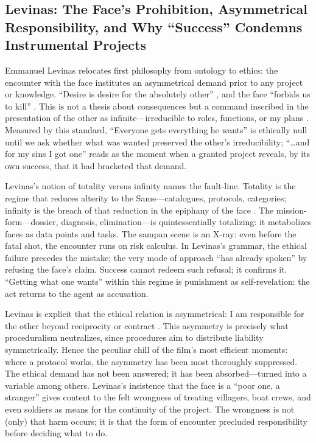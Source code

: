 \subsection*{Levinas: The Face's Prohibition, Asymmetrical Responsibility, and Why
	``Success'' Condemns Instrumental Projects}
\label{ssec:iii-levinas}
Emmanuel Levinas relocates first philosophy from ontology to ethics: the encounter with the face
institutes an asymmetrical demand prior to any project or knowledge. ``Desire is desire for the
absolutely other'' \parencite[p.~33]{LevinasTI1969}, and the face ``forbids us to kill''
\parencite[p.~199]{LevinasTI1969}. This is not a thesis about consequences but a command
inscribed in the presentation of the other as infinite—irreducible to roles, functions, or my
plans \parencite[pp.~194--201]{LevinasTI1969}. Measured by this standard, ``Everyone gets
everything he wants'' is ethically null until we ask whether what was wanted preserved the
other's irreducibility; ``\ldots and for my sins I got one'' reads as the moment when a granted
project reveals, by its own success, that it had bracketed that demand.

Levinas's notion of totality versus infinity names the fault-line. Totality is the regime that
reduces alterity to the Same—catalogues, protocols, categories; infinity is the breach of that
reduction in the epiphany of the face \parencite[pp.~21--24, 33--36]{LevinasTI1969}. The
mission-form—dossier, diagnosis, elimination—is quintessentially totalizing: it metabolizes
faces as data points and tasks. The sampan scene is an X-ray: even before the fatal shot, the
encounter runs on risk calculus. In Levinas's grammar, the ethical failure precedes the mistake;
the very mode of approach ``has already spoken'' by refusing the face's claim. Success cannot
redeem such refusal; it confirms it. ``Getting what one wants'' within this regime is punishment
as self-revelation: the act returns to the agent as accusation.

Levinas is explicit that the ethical relation is asymmetrical: I am responsible for the other
beyond reciprocity or contract \parencite[pp.~215--219]{LevinasTI1969}. This asymmetry is
precisely what proceduralism neutralizes, since procedures aim to distribute liability
symmetrically. Hence the peculiar chill of the film's most efficient moments: where a protocol
works, the asymmetry has been most thoroughly suppressed. The ethical demand has not been
answered; it has been absorbed—turned into a variable among others. Levinas's insistence that
the face is a ``poor one, a stranger'' \parencite[p.~213]{LevinasTI1969} gives content to the
felt wrongness of treating villagers, boat crews, and even soldiers as means for the continuity
of the project. The wrongness is not (only) that harm occurs; it is that the form of encounter
precluded responsibility before deciding what to do.

